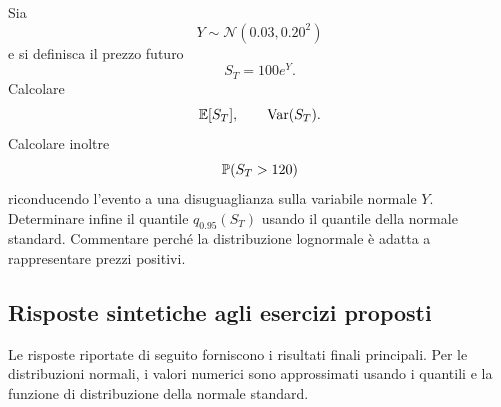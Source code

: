 \begin{exercise}
\label{ex:cap2-prop-lognormale-prezzo}

Sia
\[
Y\sim\mathcal{N}(0.03,0.20^2)
\]
e si definisca il prezzo futuro
\[
S_T=100e^Y.
\]
Calcolare
\[
\mathbb{E}[S_T],
\qquad
\operatorname{Var}(S_T).
\]
Calcolare inoltre
\[
\mathbb{P}(S_T>120)
\]
riconducendo l'evento a una disuguaglianza sulla variabile normale $Y$.
Determinare infine il quantile $q_{0.95}(S_T)$ usando il quantile della normale
standard. Commentare perch\'{e} la distribuzione lognormale \`{e} adatta a
rappresentare prezzi positivi.
\end{exercise}

\subsection*{Risposte sintetiche agli esercizi proposti}

Le risposte riportate di seguito forniscono i risultati finali principali. Per le
distribuzioni normali, i valori numerici sono approssimati usando i quantili e la
funzione di distribuzione della normale standard.

